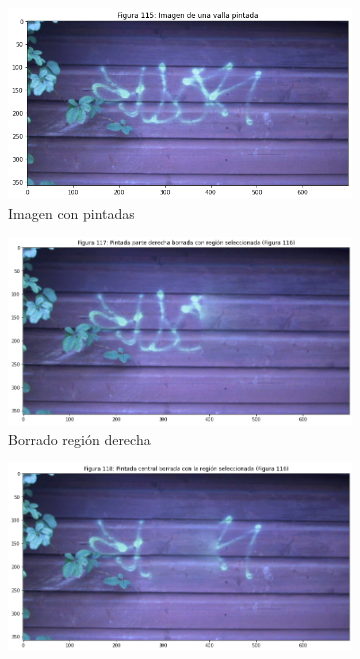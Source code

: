 \documentclass[11pt,twoside,titlepage,a4paper]{article}
\numberwithin{equation}{section} %
\theoremstyle{usual}
\begin{document}
\begin{figure}[h]
    \centering
    \begin{subfigure}[t]{.3\textwidth}
        \centering
        \includegraphics[width=\textwidth]{imagenes/PoissonImageEditing_cell_118_output_0.png}
        \caption{Imagen con pintadas}
        \label{fig:paredPintada}
    \end{subfigure}
    \centering
    \begin{subfigure}[t]{.3\textwidth}
        \centering
        \includegraphics[width=\textwidth]{imagenes/PoissonImageEditing_cell_118_output_2.png}
        \caption{Borrado región derecha}
        \label{fig:borradoDerecho}
    \end{subfigure}
    \centering
    \begin{subfigure}[t]{.3\textwidth}
        \centering
        \includegraphics[width=\textwidth]{imagenes/PoissonImageEditing_cell_118_output_3.png}

\end{subfigure}
\end{figure}
\end{document}
